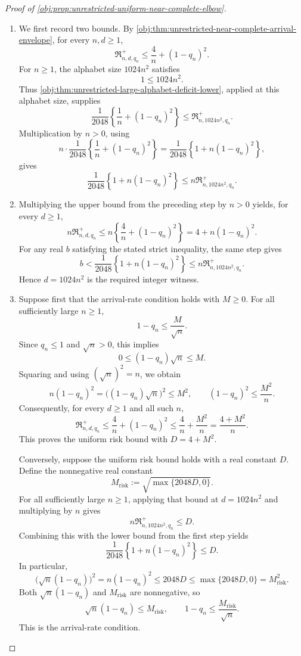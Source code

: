 \begin{proof}[Proof of \cref{obj:prop:unrestricted-uniform-near-complete-elbow}]
\begin{enumerate}
\item We first record two bounds. By \cref{obj:thm:unrestricted-near-complete-arrival-envelope}, for every \(n,d\ge1\),
\[
\mathfrak R^{+}_{n,d,q_n}\le \frac4n+(1-q_n)^2.
\]
For \(n\ge1\), the alphabet size \(1024n^2\) satisfies
\[
1\le1024n^2.
\]
Thus \cref{obj:thm:unrestricted-large-alphabet-deficit-lower}, applied at this alphabet size, supplies
\[
\frac1{2048}\left\{\frac1n+(1-q_n)^2\right\}
\le \mathfrak R^{+}_{n,1024n^2,q_n}.
\]
Multiplication by \(n>0\), using
\[
n\cdot\frac1{2048}\left\{\frac1n+(1-q_n)^2\right\}
=\frac1{2048}\left\{1+n(1-q_n)^2\right\},
\]
gives
\[
\frac1{2048}\left\{1+n(1-q_n)^2\right\}
\le n\mathfrak R^{+}_{n,1024n^2,q_n}.
\]

\item Multiplying the upper bound from the preceding step by \(n>0\) yields, for every \(d\ge1\),
\[
n\mathfrak R^{+}_{n,d,q_n}
\le n\left\{\frac4n+(1-q_n)^2\right\}
=4+n(1-q_n)^2.
\]
For any real \(b\) satisfying the stated strict inequality, the same step gives
\[
b<
\frac1{2048}\left\{1+n(1-q_n)^2\right\}
\le n\mathfrak R^{+}_{n,1024n^2,q_n}.
\]
Hence \(d=1024n^2\) is the required integer witness.

\item Suppose first that the arrival-rate condition holds with \(M\ge0\). For all sufficiently large \(n\ge1\),
\[
1-q_n\le\frac{M}{\sqrt n}.
\]
Since \(q_n\le1\) and \(\sqrt n>0\), this implies
\[
0\le(1-q_n)\sqrt n\le M.
\]
Squaring and using \((\sqrt n)^2=n\), we obtain
\[
n(1-q_n)^2
=\bigl((1-q_n)\sqrt n\bigr)^2
\le M^2,
\qquad
(1-q_n)^2\le\frac{M^2}{n}.
\]
Consequently, for every \(d\ge1\) and all such \(n\),
\[
\mathfrak R^{+}_{n,d,q_n}
\le\frac4n+(1-q_n)^2
\le\frac4n+\frac{M^2}{n}
=\frac{4+M^2}{n}.
\]
This proves the uniform risk bound with \(D=4+M^2\).

Conversely, suppose the uniform risk bound holds with a real constant \(D\). Define the nonnegative real constant
\[
M_{\mathrm{risk}}:=\sqrt{\max\{2048D,0\}}.
\]
For all sufficiently large \(n\ge1\), applying that bound at \(d=1024n^2\) and multiplying by \(n\) gives
\[
n\mathfrak R^{+}_{n,1024n^2,q_n}\le D.
\]
Combining this with the lower bound from the first step yields
\[
\frac1{2048}\left\{1+n(1-q_n)^2\right\}\le D.
\]
In particular,
\[
\bigl(\sqrt n(1-q_n)\bigr)^2
=n(1-q_n)^2
\le2048D
\le\max\{2048D,0\}
=M_{\mathrm{risk}}^2.
\]
Both \(\sqrt n(1-q_n)\) and \(M_{\mathrm{risk}}\) are nonnegative, so
\[
\sqrt n(1-q_n)\le M_{\mathrm{risk}},
\qquad
1-q_n\le\frac{M_{\mathrm{risk}}}{\sqrt n}.
\]
This is the arrival-rate condition.


\end{enumerate}
\end{proof}
